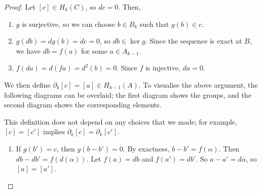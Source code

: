 \begin{proof}
	Let \( [c] \in H_k(C) \), so \( dc = 0 \).
	Then,
	\begin{enumerate}
		\item \( g \) is surjective, so we can choose \( b \in B_k \) such that \( g(b) \in c \).
		\item \( g(db) = dg(b) = dc = 0 \), so \( db \in \ker g \).
			Since the sequence is exact at \( B \), we have \( db = f(a) \) for some \( a \in A_{k-1} \).
		\item \( f(da) = d(fa) = d^2(b) = 0 \).
			Since \( f \) is injective, \( da = 0 \).
	\end{enumerate}
	We then define \( \partial_k[c] = [a] \in H_{k-1}(A) \).
	To visualise the above argument, the following diagrams can be overlaid; the first diagram shows the groups, and the second diagram shows the corresponding elements.
	\begin{center}
	\end{center}
	This definition does not depend on any choices that we made; for example, \( [c] = [c'] \) implies \( \partial_k[c] = \partial_k[c'] \).
	\begin{enumerate}
		\item If \( g(b') = c \), then \( g(b-b') = 0 \).
			By exactness, \( b - b' = f(\alpha) \).
			Then \( db - db' = f(d(\alpha)) \).
			Let \( f(a) = db \) and \( f(a') = db' \).
			So \( a - a' = d\alpha \), so \( [a] = [a'] \).

\end{enumerate}
\end{proof}
